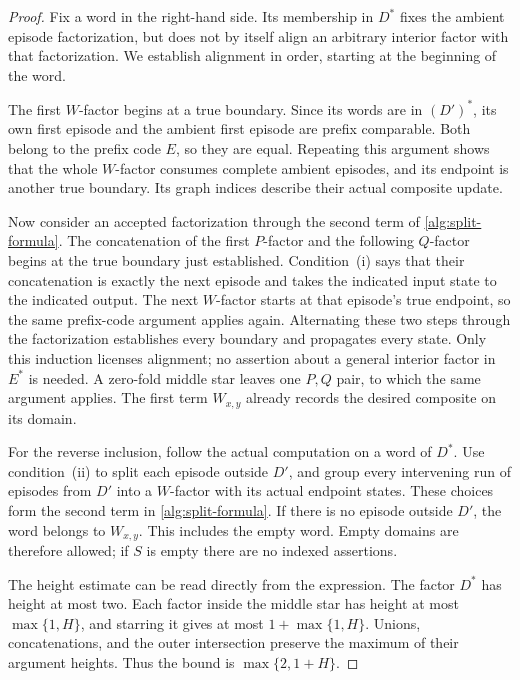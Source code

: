 \begin{proof}
Fix a word in the right-hand side. Its membership in $D^*$ fixes the
ambient episode factorization, but does not by itself align an arbitrary
interior factor with that factorization. We establish alignment in order,
starting at the beginning of the word.

The first $W$-factor begins at a true boundary. Since its words are in
$(D')^*$, its own first episode and the ambient first episode are prefix
comparable. Both belong to the prefix code $E$, so they are equal.
Repeating this argument shows that the whole $W$-factor consumes complete
ambient episodes, and its endpoint is another true boundary. Its graph
indices describe their actual composite update.

Now consider an accepted factorization through the second term of
\eqref{alg:split-formula}. The concatenation of the first $P$-factor and
the following $Q$-factor begins at the true boundary just established.
Condition~\textup{(i)} says that their concatenation is exactly the next
episode and takes the indicated input state to the indicated output.
The next $W$-factor starts at that episode's true endpoint, so the same
prefix-code argument applies again. Alternating these two steps through
the factorization establishes every boundary and propagates every state.
Only this induction licenses alignment; no assertion about a general
interior factor in $E^*$ is needed. A zero-fold middle star leaves one
$P,Q$ pair, to which the same argument applies. The first term $W_{x,y}$
already records the desired composite on its domain.

For the reverse inclusion, follow the actual computation on a word of
$D^*$. Use condition~\textup{(ii)} to split each episode outside $D'$,
and group every intervening run of episodes from $D'$ into a $W$-factor
with its actual endpoint states. These choices form the second term in
\eqref{alg:split-formula}. If there is no episode outside $D'$, the word
belongs to $W_{x,y}$. This includes the empty word. Empty domains are
therefore allowed; if $S$ is empty there are no indexed assertions.

The height estimate can be read directly from the expression. The factor
$D^*$ has height at most two. Each factor inside the middle star has
height at most $\max\{1,H\}$, and starring it gives at most
$1+\max\{1,H\}$. Unions, concatenations, and the outer intersection
preserve the maximum of their argument heights. Thus the bound is
$\max\{2,1+H\}$.
\end{proof}

